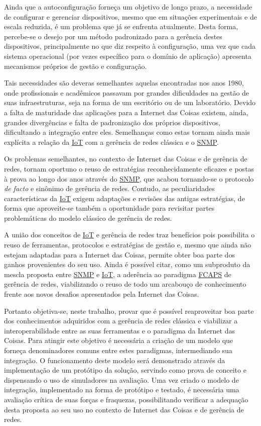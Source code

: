 \documentclass[twoside,english,brazilian]{UNISINOSmonografia}
\begin{document}
Ainda que a autoconfiguração forneça um objetivo de longo prazo, a necessidade 
de configurar e gerenciar dispositivos, mesmo que em situações experimentais e 
de escala reduzida, é um problema que já se enfrenta atualmente.
Desta forma, percebe-se o desejo por um método padronizado para a gerência  
destes dispositivos, principalmente no que diz respeito à configuração, uma 
vez que cada sistema operacional (por vezes específico para o domínio de 
aplicação) apresenta mecanismos próprios de gestão e configuração.


Tais necessidades são deveras semelhantes aquelas encontradas nos anos 1980, 
onde profissionais e acadêmicos passavam por grandes dificuldades na gestão 
de suas infraestruturas, seja na forma de um escritório ou de um laboratório.
Devido a falta de maturidade das aplicações para a Internet das Coisas 
existem, ainda, grandes divergências e falta de padronização dos próprios 
dispositivos, dificultando a integração entre eles.
Semelhanças como estas tornam ainda mais explícita a relação da 
\hyperref[siglas]{IoT} com a gerência de redes clássica e o 
\hyperref[siglas]{SNMP}.


Os problemas semelhantes, no contexto de Internet das Coisas e de gerência de 
redes, tornam oportuno o reuso de estratégias reconhecidamente eficazes e 
postas à prova ao longo dos anos através do \hyperref[siglas]{SNMP}, que acabou tornando-se 
o protocolo \textit{de facto} e sinônimo de gerência de redes.
Contudo, as peculiaridades características da \hyperref[siglas]{IoT} exigem adaptações e revisões 
das antigas estratégias, de forma que aproveite-se também a oportunidade para 
revisitar partes problemáticas do modelo clássico de gerência de redes.


A união dos conceitos de \hyperref[siglas]{IoT} e gerência de redes traz benefícios pois 
possibilita o reuso de ferramentas, protocolos e estratégias de gestão e, 
mesmo que ainda não estejam adaptadas para a Internet das Coisas, permite 
obter boa parte dos ganhos provenientes do seu uso.
Ainda é possível citar, como um subproduto da mescla proposta entre \hyperref[siglas]{SNMP} e 
\hyperref[siglas]{IoT}, a aderência ao paradigma \hyperref[siglas]{FCAPS} de gerência de redes, viabilizando o 
reuso de todo um arcabouço de conhecimento frente aos novos desafios 
apresentados pela Internet das Coisas.


Portanto objetiva-se, neste trabalho, provar que é possível reaproveitar boa 
parte dos conhecimentos adquiridos com a gerência de redes clássica e 
viabilizar a interoperabilidade entre as suas ferramentas e o paradigma da 
Internet das Coisas.
Para atingir este objetivo é necessária a criação de um modelo que forneça 
denominadores comuns entre estes paradigmas, intermediando sua integração.
O funcionamento deste modelo será demonstrado através da implementação de 
um protótipo da solução, servindo como prova de conceito e dispensando o uso 
de simuladores na avaliação.
Uma vez criado o modelo de integração, implementado na forma de protótipo e 
testado, é necessária uma avaliação crítica de suas forças e fraquezas, 
possibilitando verificar a adequação desta proposta ao seu uso no contexto de 
Internet das Coisas e de gerência de redes.
\end{document}
